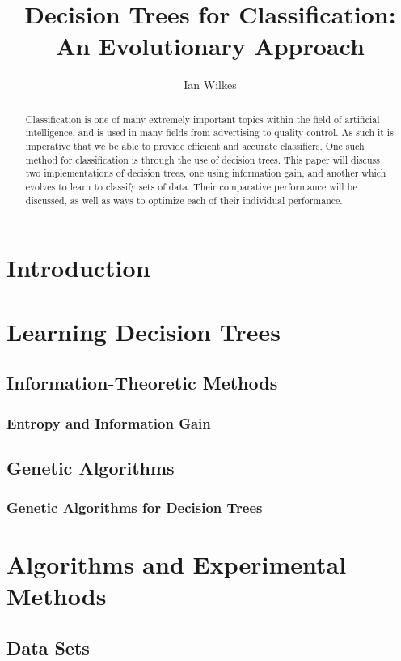 \documentclass[12pt, letterpaper]{article}
\title{Decision Trees for Classification: \\ An Evolutionary Approach}
\author{Ian Wilkes}
\begin{document}
\maketitle

\begin{abstract}
Classification is one of many extremely important topics within the field of 
artificial intelligence, and is used in many fields from advertising to 
quality control.  As such it is imperative that we be able to provide efficient
and accurate classifiers. One such method for classification is through the use
of decision trees.  This paper will discuss two implementations of decision trees, one using information gain, and another which evolves to learn to classify
sets of data.  Their comparative performance will be discussed, as well as 
ways to optimize each of their individual performance. 


\end{abstract}

\section{Introduction}

\section{Learning Decision Trees}
\subsection{Information-Theoretic Methods}
\subsubsection*{Entropy and Information Gain}
\subsection{Genetic Algorithms}

\subsubsection*{Genetic Algorithms for Decision Trees}

\section{Algorithms and Experimental Methods}

\subsection*{Data Sets}
\end{document}
